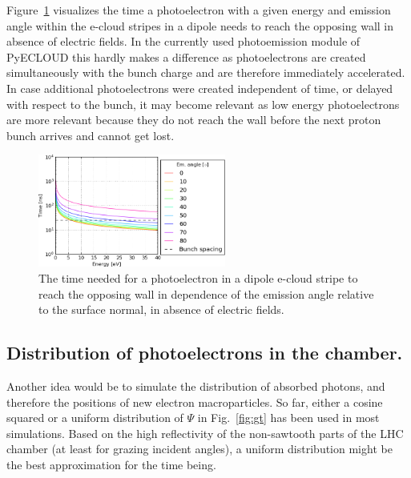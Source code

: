 Figure~\ref{fig:time} visualizes the time a photoelectron with a given energy and emission angle within the e-cloud stripes in a dipole needs to reach the opposing wall in absence of electric fields.
In the currently used photoemission module of PyECLOUD this hardly makes a difference as photoelectrons are created simultaneously with the bunch charge and are therefore immediately accelerated.
In case additional photoelectrons were created independent of time, or delayed with respect to the bunch, it may become relevant as low energy photoelectrons are more relevant because they do not reach the wall before the next proton bunch arrives and cannot get lost.

\begin{figure}[tbh]
    \centering
    \includegraphics[width=0.55\textwidth]{../plots/time.png}
    \caption{The time needed for a photoelectron in a dipole e-cloud stripe to reach the opposing wall in dependence of the emission angle relative to the surface normal, in absence of electric fields.}
    \label{fig:time}
\end{figure}



\subsection{Distribution of photoelectrons in the chamber.}
\label{sec:photon_cdf}

Another idea would be to simulate the distribution of absorbed photons, and therefore the positions of new electron macroparticles.
So far, either a cosine squared or a uniform distribution of $\Psi$ in Fig.~\ref{fig:gt} has been used in most simulations.
Based on the high reflectivity of the non-sawtooth parts of the LHC chamber (at least for grazing incident angles), a uniform distribution might be the best approximation for the time being.


